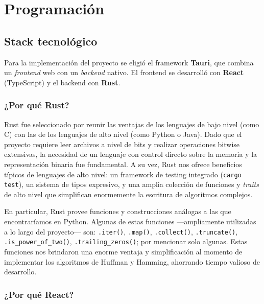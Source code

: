 \chapter*{Programación}

\section*{Stack tecnológico}


Para la implementación del proyecto se eligió el framework \textbf{Tauri}, que combina un \textit{frontend} web con un \textit{backend} nativo. El frontend se desarrolló con \textbf{React} (TypeScript) y el backend con \textbf{Rust}.

\subsection*{¿Por qué Rust?}


Rust fue seleccionado por reunir las ventajas de los lenguajes de bajo nivel (como C) con las de los lenguajes de alto nivel (como Python o Java). Dado que el proyecto requiere leer archivos a nivel de bits y realizar operaciones bitwise extensivas, la necesidad de un lenguaje con control directo sobre la memoria y la representación binaria fue fundamental. A su vez, Rust nos ofrece beneficios típicos de lenguajes de alto nivel: un framework de testing integrado (\texttt{cargo test}), un sistema de tipos expresivo, y una amplia colección de funciones y \textit{traits} de alto nivel que simplifican enormemente la escritura de algoritmos complejos.

En particular, Rust provee funciones y construcciones análogas a las que encontraríamos en Python. Algunas de estas funciones ---ampliamente utilizadas a lo largo del proyecto--- son: \texttt{.iter()}, \texttt{.map()}, \texttt{.collect()}, \texttt{.truncate()}, \texttt{.is\_power\_of\_two()}, \texttt{.trailing\_zeros()}; por mencionar solo algunas. Estas funciones nos brindaron una enorme ventaja y simplificación al momento de implementar los algoritmos de Huffman y Hamming, ahorrando tiempo valioso de desarrollo.

\subsection*{¿Por qué React?}


